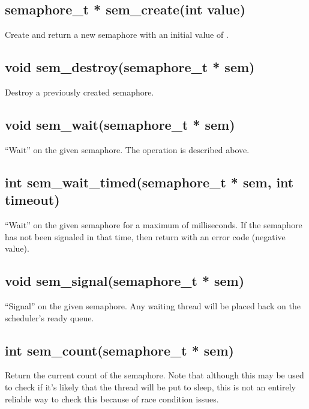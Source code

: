 \documentclass[english]{report}
\begin{document}
\subsection{semaphore\_t * sem\_create(int value)}

Create and return a new semaphore with an initial value of .


\subsection{void sem\_destroy(semaphore\_t * sem)}

Destroy a previously created semaphore.


\subsection{void sem\_wait(semaphore\_t * sem)}

``Wait'' on the given semaphore. The operation is described above.


\subsection{int sem\_wait\_timed(semaphore\_t * sem, int timeout)}

``Wait'' on the given semaphore for a maximum of 
milliseconds. If the semaphore has not been signaled in that time,
then return with an error code (negative value).


\subsection{void sem\_signal(semaphore\_t * sem)}

``Signal'' on the given semaphore. Any waiting thread will be
placed back on the scheduler's ready queue.


\subsection{int sem\_count(semaphore\_t * sem)}

Return the current count of the semaphore. Note that although this
may be used to check if it's likely that the thread will be put to
sleep, this is not an entirely reliable way to check this because
of race condition issues.
\end{document}
